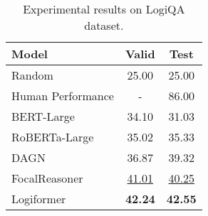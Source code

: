 \documentclass[sigconf]{acmart}
\begin{document}
\begin{table}[t]
	\centering
	\caption{Experimental results on LogiQA dataset.}
	\vspace{-0.3cm}
	\begin{tabular}{p{3.5cm}|cc}
		\toprule
		\textbf{Model} &\textbf{Valid} &\textbf{Test}\\
		\hline
		Random &25.00 &25.00 \\
		Human Performance\cite{liu2020logiqa} &- &86.00 \\
		BERT-Large \cite{liu2020logiqa} &34.10 &31.03 \\
		RoBERTa-Large \cite{liu2020logiqa} &35.02 &35.33 \\
		DAGN \cite{huang2021dagn} &36.87 &39.32 \\
		FocalReasoner \cite{ouyang2021fact} &\underline{41.01} &\underline{40.25} \\
		\hline
		Logiformer &\textbf{42.24} &\textbf{42.55} \\
		\bottomrule
	\end{tabular}
	\label{tab:LogiQA_main}
	\vspace{-0.3cm}
\end{table}
\end{document}
